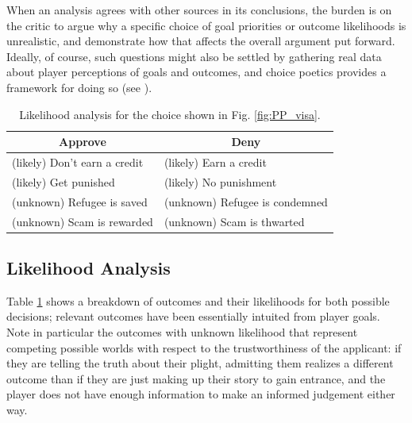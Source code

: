 \documentclass[arts,article,submit,moreauthors,pdftex,10pt,a4paper]{Definitions/mdpi}
\begin{document}
When an analysis agrees with other sources in its conclusions, the burden is on the critic to argue why a specific choice of goal priorities or outcome likelihoods is unrealistic, and demonstrate how that affects the overall argument put forward.
%
Ideally, of course, such questions might also be settled by gathering real data about player perceptions of goals and outcomes, and choice poetics provides a framework for doing so (see \cite{mawhorter2015intentionally}).

\begin{table}[H]
\centering
\begin{tabular}{l l}
  \toprule
  \multicolumn{1}{c}{\textbf{Approve}} & \multicolumn{1}{c}{\textbf{Deny}} \\
  \midrule
  (likely) Don't earn a credit & (likely) Earn a credit \\
  (likely) Get punished & (likely) No punishment \\
  (unknown) Refugee is saved & (unknown) Refugee is condemned \\
  (unknown) Scam is rewarded & (unknown) Scam is thwarted \\
  \bottomrule
\end{tabular}
\caption[\emph{Papers, Please} likelihood analysis]{Likelihood analysis for the choice shown in Fig. \ref{fig:PP_visa}.}
\label{tab:PP_likelihoods}
\end{table}

\subsection{Likelihood Analysis}

Table \ref{tab:PP_likelihoods} shows a breakdown of outcomes and their likelihoods for both possible decisions; relevant outcomes have been essentially intuited from player goals.
%
Note in particular the outcomes with unknown likelihood that represent competing possible worlds with respect to the trustworthiness of the applicant: if they are telling the truth about their plight, admitting them realizes a different outcome than if they are just making up their story to gain entrance, and the player does not have enough information to make an informed judgement either way.
\end{document}
